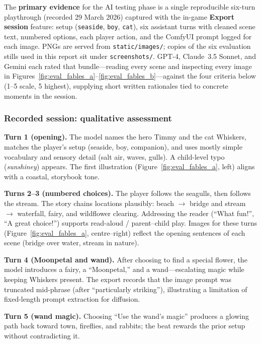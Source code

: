 \documentclass[12pt,a4paper]{article}
\begin{document}
The \textbf{primary evidence} for the AI testing phase is a single reproducible six-turn playthrough (recorded 29 March 2026) captured with the in-game \textbf{Export session} feature: setup (\texttt{seaside}, \texttt{boy}, \texttt{cat}), six assistant turns with cleaned scene text, numbered options, each player action, and the ComfyUI prompt logged for each image. PNGs are served from \texttt{static/images/}; copies of the six evaluation stills used in this report sit under \texttt{screenshots/}. GPT-4, Claude~3.5 Sonnet, and Gemini each rated that bundle---reading every scene and inspecting every image in Figures~\ref{fig:eval_fables_a}--\ref{fig:eval_fables_b}---against the four criteria below (1--5 scale, 5 highest), supplying short written rationales tied to concrete moments in the session.

\subsubsection{Recorded session: qualitative assessment}

\textbf{Turn 1 (opening).} The model names the hero Timmy and the cat Whiskers, matches the player's setup (seaside, boy, companion), and uses mostly simple vocabulary and sensory detail (salt air, waves, gulls). A child-level typo (\textit{sunshiney}) appears. The first illustration (Figure~\ref{fig:eval_fables_a}, left) aligns with a coastal, storybook tone.

\textbf{Turns 2--3 (numbered choices).} The player follows the seagulls, then follows the stream. The story chains locations plausibly: beach $\rightarrow$ bridge and stream $\rightarrow$ waterfall, fairy, and wildflower clearing. Addressing the reader (``What fun!'', ``A great choice!'') supports read-aloud / parent--child play. Images for these turns (Figure~\ref{fig:eval_fables_a}, centre--right) reflect the opening sentences of each scene (bridge over water, stream in nature).

\textbf{Turn 4 (Moonpetal and wand).} After choosing to find a special flower, the model introduces a fairy, a ``Moonpetal,'' and a wand---escalating magic while keeping Whiskers present. The export records that the image prompt was truncated mid-phrase (after ``particularly striking''), illustrating a limitation of fixed-length prompt extraction for diffusion.

\textbf{Turn 5 (wand magic).} Choosing ``Use the wand's magic'' produces a glowing path back toward town, fireflies, and rabbits; the beat rewards the prior setup without contradicting it.
\end{document}

